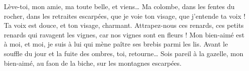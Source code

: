 Lève-toi, mon amie, ma toute belle, et viens…
Ma colombe, dans les fentes du rocher, dans les retraites escarpées, que je voie ton visage, que j’entende ta voix ! Ta voix est douce, et ton visage, charmant.
Attrapez-nous ces renards, ces petits renards qui ravagent les vignes, car nos vignes sont en fleurs !
Mon bien-aimé est à moi, et moi, je suis à lui qui mène paître ses brebis parmi les lis.
Avant le souffle du jour et la fuite des ombres, toi, retourne… Sois pareil à la gazelle, mon bien-aimé, au faon de la biche, sur les montagnes escarpées.
